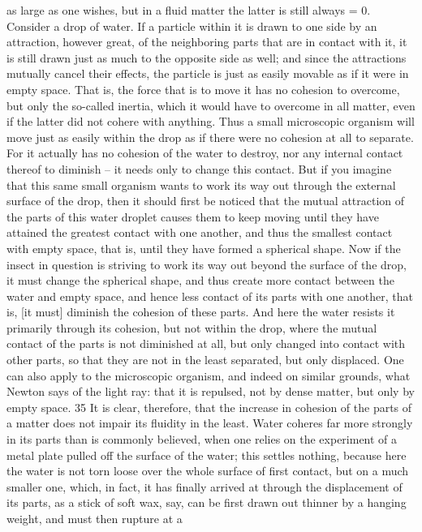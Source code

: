 as large as one wishes, but in a ﬂuid matter the latter is still always = 0.
Consider a drop of water. If a particle within it is drawn to one side by
an attraction, however great, of the neighboring parts that are in contact
with it, it is still drawn just as much to the opposite side as well; and
since the attractions mutually cancel their effects, the particle is just as
easily movable as if it were in empty space. That is, the force that is
to move it has no cohesion to overcome, but only the so-called inertia,
which it would have to overcome in all matter, even if the latter did not
cohere with anything. Thus a small microscopic organism will move just
as easily within the drop as if there were no cohesion at all to separate.
For it actually has no cohesion of the water to destroy, nor any internal
contact thereof to diminish – it needs only to change this contact. But
if you imagine that this same small organism wants to work its way out
through the external surface of the drop, then it should ﬁrst be noticed
that the mutual attraction of the parts of this water droplet causes them
to keep moving until they have attained the greatest contact with one
another, and thus the smallest contact with empty space, that is, until they
have formed a spherical shape. Now if the insect in question is striving
to work its way out beyond the surface of the drop, it must change the
spherical shape, and thus create more contact between the water and
empty space, and hence less contact of its parts with one another, that
is, [it must] diminish the cohesion of these parts. And here the water
resists it primarily through its cohesion, but not within the drop, where
the mutual contact of the parts is not diminished at all, but only changed
into contact with other parts, so that they are not in the least separated,
but only displaced. One can also apply to the microscopic organism, and
indeed on similar grounds, what Newton says of the light ray: that it
is repulsed, not by dense matter, but only by empty space. 35 It is clear,
therefore, that the increase in cohesion of the parts of a matter does
not impair its ﬂuidity in the least. Water coheres far more strongly in
its parts than is commonly believed, when one relies on the experiment
of a metal plate pulled off the surface of the water; this settles nothing,
because here the water is not torn loose over the whole surface of ﬁrst
contact, but on a much smaller one, which, in fact, it has ﬁnally arrived
at through the displacement of its parts, as a stick of soft wax, say, can be
ﬁrst drawn out thinner by a hanging weight, and must then rupture at a
